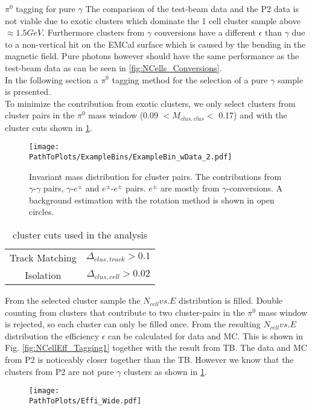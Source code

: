 \documentclass[ALICE]{ALICE_analysis_notes}
\newcommand{\PZ}{$\pi^0$\xspace}
\newcommand{\g}{$\gamma$\xspace}
\newcommand{\PathToPlots}{/home/joshua/PCG_Software/EMCal_NCellEffi/13TeVNomB_Wide/Pi0Tagging_13TeV_nom_04_26_WithTRD_WithBorderCells_1cellFT/pdf}
\begin{document}
\begin{section}{$\pi^{0}$ tagging for pure $\gamma$}
	The comparison of the test-beam data and the P2 data is not viable due to exotic clusters which dominate the 1 cell cluster sample above $\approx 1.5 GeV$. Furthermore clusters from \g conversions have a different $\epsilon$ than \g due to a non-vertical hit on the EMCal surface which is caused by the bending in the magnetic field. Pure photons however should have the same performance as the test-beam data as can be seen in \ref{fig:NCells_Conversions}. \\
	In the following section a \PZ tagging method for the selection of a pure \g sample is presented.\\
	To minimize the contribution from exotic clusters, we only select clusters from cluster pairs in the \PZ mass window (0.09 $< M_{clus, clus} <$ 0.17) and with the cluster cuts shown in \ref{Tab:ClusCuts}. 
	\begin{figure}[h!]
		\centering
		\texttt{[image: \\PathToPlots/ExampleBins/ExampleBin\_wData\_2.pdf]}	

		\caption{  Invariant mass distribution for cluster pairs. The contributions from \g-\g pairs, \g-$e^{\pm}$ and $e^{\pm}$-$e^{\pm}$ pairs. $e^{\pm}$ are mostly from \g-conversions. A background estimation with the rotation method is shown in open circles.}
		\label{fig:Pi0InvMass}
	\end{figure}


\begin{table}[h!]
	\centering
	\begin{tabular}{ c c }
		\hline
		Track Matching & $\Delta_{clus, track} > 0.1$ \\ 
		Isolation & $\Delta_{clus, cell} > 0.02$ \\
		\hline

	\end{tabular}	
	
	\caption{ cluster cuts used in the analysis }
	\label{Tab:ClusCuts} 
\end{table}


	
	From the selected cluster sample the $N_{cell} vs. E$ distribution is filled. Double counting from clusters that contribute to two cluster-pairs in the \PZ mass window is rejected, so each cluster can only be filled once. From the resulting $N_{cell} vs. E$ distribution the efficiency $\epsilon$ can be calculated for data and MC. This is shown in Fig. \ref{fig:NCellEff_Tagging1} together with the result from TB. The data and MC from P2 is noticeably closer together than the TB. However we know that the clusters from P2 are not pure \g clusters as shown in \ref{fig:Pi0InvMass}.\\
		\begin{figure}[h!]
		\centering
		\texttt{[image: \\PathToPlots/Effi\_Wide.pdf]}	
		

\end{figure}
\end{section}
\end{document}
